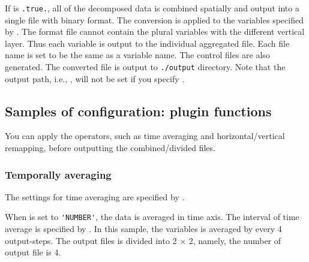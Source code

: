 If  is \verb|.true.|, all of the decomposed data is combined spatially and output into a single file with \grads binary format.
The conversion is applied to the variables specified by .
The \grads format file cannot contain the plural variables with the different vertical layer.
Thus each variable is output to the individual aggregated file.
Each file name is set to be the same as a variable name. The control files are also generated.
The converted file is output to \verb|./output| directory. Note that the output path, i.e., , will not be set if you specify .




\subsection{Samples of configuration: plugin functions}

You can apply the operators, such as time averaging and horizontal/vertical remapping, before outputting the combined/divided files.

\subsubsection{Temporally averaging}

The settings for time averaging are specified by .
%

When  is set to \verb|'NUMBER'|, the data is averaged in time axis.
The interval of time average is specified by .
In this sample, the variables is averaged by every 4 output-steps.
The output files is divided into 2 $\times$ 2, namely, the number of output file is 4.


